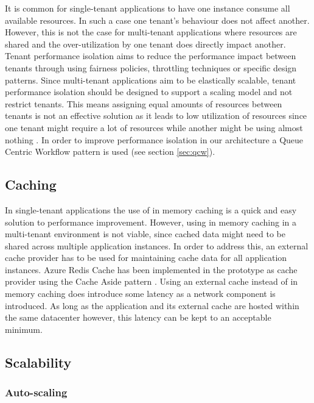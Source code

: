 It is common for single-tenant applications to have one instance consume all available resources. In such a case one tenant's behaviour does not affect another. However, this is not the case for multi-tenant applications where resources are shared and the over-utilization by one tenant does directly impact another. Tenant performance isolation aims to reduce the performance impact between tenants through using fairness policies, throttling techniques or specific design patterns. Since multi-tenant applications aim to be elastically scalable, tenant performance isolation should be designed to support a scaling model and not restrict tenants. This means assigning equal amounts of resources between tenants is not an effective solution as it leads to low utilization of resources since one tenant might require a lot of resources while another might be using almost nothing \cite{Bezemer:2010:MSA:1862372.1862393}. In order to improve performance isolation in our architecture a Queue Centric Workflow pattern is used (see section \ref{sec:qcw}). 

\subsection{Caching}

In single-tenant applications the use of in memory caching is a quick and easy solution to performance improvement. However, using in memory caching in a multi-tenant environment is not viable, since cached data might need to be shared across multiple application instances. In order to address this, an external cache provider has to be used for maintaining cache data for all application instances. Azure Redis Cache  has been implemented in the prototype  as cache provider using the Cache Aside pattern \cite{Homer2014}. Using an external cache instead of in memory caching does introduce some latency as a network component is introduced. As long as the application and its external cache are hosted within the same datacenter however, this latency can be kept to an acceptable minimum.


\subsection{Scalability}
\label{sec:scalability}

\subsubsection{Auto-scaling}

